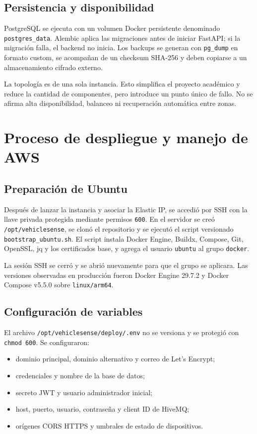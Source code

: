 \documentclass[12pt,a4paper,oneside]{report}
\newcommand{\code}[1]{\texttt{\small #1}}
\begin{document}
\section{Persistencia y disponibilidad}

PostgreSQL se ejecuta con un volumen Docker persistente denominado
\code{postgres\_data}. Alembic aplica las migraciones antes de iniciar FastAPI; si
la migración falla, el backend no inicia. Los backups se generan con
\code{pg\_dump} en formato custom, se acompañan de un checksum SHA-256 y deben
copiarse a un almacenamiento cifrado externo.

La topología es de una sola instancia. Esto simplifica el proyecto académico y
reduce la cantidad de componentes, pero introduce un punto único de fallo. No se
afirma alta disponibilidad, balanceo ni recuperación automática entre zonas.

\chapter{Proceso de despliegue y manejo de AWS}

\section{Preparación de Ubuntu}

Después de lanzar la instancia y asociar la Elastic IP, se accedió por SSH con la
llave privada protegida mediante permisos \code{600}. En el servidor se creó
\code{/opt/vehiclesense}, se clonó el repositorio y se ejecutó el script versionado
\code{bootstrap\_ubuntu.sh}. El script instala Docker Engine, Buildx, Compose,
Git, OpenSSL, jq y los certificados base, y agrega el usuario \code{ubuntu} al
grupo \code{docker}.

La sesión SSH se cerró y se abrió nuevamente para que el grupo se aplicara. Las
versiones observadas en producción fueron Docker Engine 29.7.2 y Docker Compose
v5.5.0 sobre \code{linux/arm64}.

\section{Configuración de variables}

El archivo \code{/opt/vehiclesense/deploy/.env} no se versiona y se protegió con
\code{chmod 600}. Se configuraron:

\begin{itemize}
  \item dominio principal, dominio alternativo y correo de Let's Encrypt;
  \item credenciales y nombre de la base de datos;
  \item secreto JWT y usuario administrador inicial;
  \item host, puerto, usuario, contraseña y client ID de HiveMQ;
  \item orígenes CORS HTTPS y umbrales de estado de dispositivos.
\end{itemize}
\end{document}
